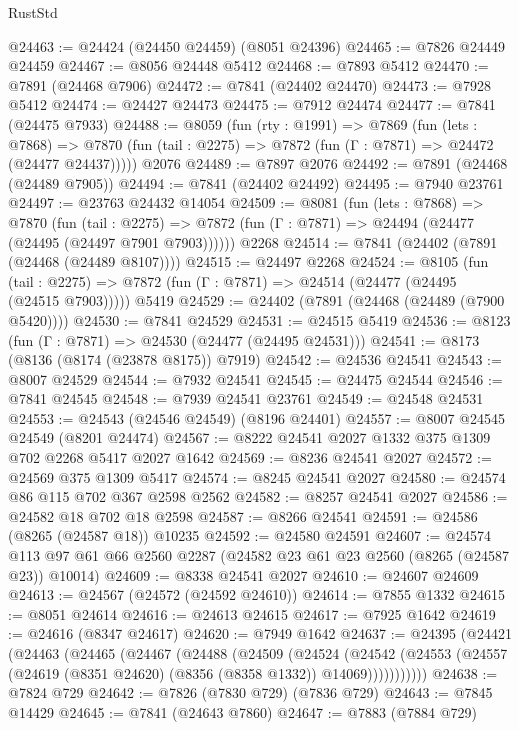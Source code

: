 \begin{lexlean}{RustStd}
\begin{coremodule}
@24463 := @24424 (@24450 @24459) (@8051 @24396)
@24465 := @7826 @24449 @24459
@24467 := @8056 @24448 @5412
@24468 := @7893 @5412
@24470 := @7891 (@24468 @7906)
@24472 := @7841 (@24402 @24470)
@24473 := @7928 @5412
@24474 := @24427 @24473
@24475 := @7912 @24474
@24477 := @7841 (@24475 @7933)
@24488 := @8059
    (fun (rty : @1991) =>
    @7869
      (fun (lets : @7868) =>
      @7870 (fun (tail : @2275) => @7872 (fun (Γ : @7871) => @24472 (@24477 @24437)))))
    @2076
@24489 := @7897 @2076
@24492 := @7891 (@24468 (@24489 @7905))
@24494 := @7841 (@24402 @24492)
@24495 := @7940 @23761
@24497 := @23763 @24432 @14054
@24509 := @8081
    (fun (lets : @7868) =>
    @7870
      (fun (tail : @2275) =>
      @7872 (fun (Γ : @7871) => @24494 (@24477 (@24495 (@24497 @7901 @7903))))))
    @2268
@24514 := @7841 (@24402 (@7891 (@24468 (@24489 @8107))))
@24515 := @24497 @2268
@24524 := @8105
    (fun (tail : @2275) => @7872 (fun (Γ : @7871) => @24514 (@24477 (@24495 (@24515 @7903)))))
    @5419
@24529 := @24402 (@7891 (@24468 (@24489 (@7900 @5420))))
@24530 := @7841 @24529
@24531 := @24515 @5419
@24536 := @8123 (fun (Γ : @7871) => @24530 (@24477 (@24495 @24531)))
@24541 := @8173 (@8136 (@8174 (@23878 @8175)) @7919)
@24542 := @24536 @24541
@24543 := @8007 @24529
@24544 := @7932 @24541
@24545 := @24475 @24544
@24546 := @7841 @24545
@24548 := @7939 @24541 @23761
@24549 := @24548 @24531
@24553 := @24543 (@24546 @24549) (@8196 @24401)
@24557 := @8007 @24545 @24549 (@8201 @24474)
@24567 := @8222 @24541 @2027 @1332 @375 @1309 @702 @2268 @5417 @2027 @1642
@24569 := @8236 @24541 @2027
@24572 := @24569 @375 @1309 @5417
@24574 := @8245 @24541 @2027
@24580 := @24574 @86 @115 @702 @367 @2598 @2562
@24582 := @8257 @24541 @2027
@24586 := @24582 @18 @702 @18 @2598
@24587 := @8266 @24541
@24591 := @24586 (@8265 (@24587 @18)) @10235
@24592 := @24580 @24591
@24607 := @24574 @113 @97 @61 @66 @2560 @2287 (@24582 @23 @61 @23 @2560 (@8265 (@24587 @23)) @10014)
@24609 := @8338 @24541 @2027
@24610 := @24607 @24609
@24613 := @24567 (@24572 (@24592 @24610))
@24614 := @7855 @1332
@24615 := @8051 @24614
@24616 := @24613 @24615
@24617 := @7925 @1642
@24619 := @24616 (@8347 @24617)
@24620 := @7949 @1642
@24637 := @24395
    (@24421
      (@24463
        (@24465
          (@24467
            (@24488
              (@24509
                (@24524
                  (@24542
                    (@24553 (@24557 (@24619 (@8351 @24620) (@8356 (@8358 @1332)) @14069)))))))))))
@24638 := @7824 @729
@24642 := @7826 (@7830 @729) (@7836 @729)
@24643 := @7845 @14429
@24645 := @7841 (@24643 @7860)
@24647 := @7883 (@7884 @729)

\end{coremodule}
\end{lexlean}
